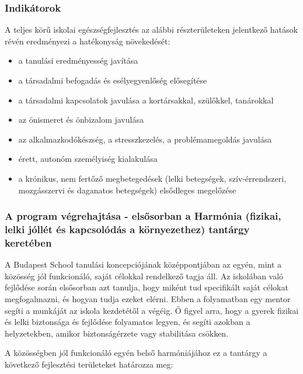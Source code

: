 \subsubsection{Indikátorok}\label{indikuxe1torok}

A teljes körű iskolai egészségfejlesztés az alábbi részterületeken
jelentkező hatások révén eredményezi a hatékonyság növekedését:

\begin{itemize}

\item
  a tanulási eredményesség javítása
\item
  a társadalmi befogadás és esélyegyenlőség elősegítése
\item
  a társadalmi kapcsolatok javulása a kortársakkal, szülőkkel,
  tanárokkal
\item
  az önismeret és önbizalom javulása
\item
  az alkalmazkodókészség, a stresszkezelés, a problémamegoldás javulása
\item
  érett, autonóm személyiség kialakulása
\item
  a krónikus, nem fertőző megbetegedések (lelki betegségek,
  szív-érrendszeri, mozgásszervi és daganatos betegségek) elsődleges
  megelőzése
\end{itemize}

\subsubsection{A program végrehajtása - elsősorban a Harmónia (fizikai,
lelki jóllét és kapcsolódás a környezethez) tantárgy
keretében}\label{a-program-vuxe9grehajtuxe1sa---elsux151sorban-a-harmuxf3nia-fizikai-lelki-juxf3lluxe9t-uxe9s-kapcsoluxf3duxe1s-a-kuxf6rnyezethez-tantuxe1rgy-keretuxe9ben}

A Budapest School tanulási koncepciójának középpontjában az egyén, mint
a közösség jól funkcionáló, saját célokkal rendelkező tagja áll. Az
iskolában való fejlődése során elsősorban azt tanulja, hogy miként tud
specifikált saját célokat megfogalmazni, és hogyan tudja ezeket elérni.
Ebben a folyamatban egy mentor segíti a munkáját az iskola kezdetétől a
végéig. Ő figyel arra, hogy a gyerek fizikai és lelki biztonsága és
fejlődése folyamatos legyen, és segíti azokban a helyzetekben, amikor
biztonságérzete vagy stabilitása csökken.

A közösségben jól funkcionáló egyén belső harmóniájához ez a tantárgy a
következő fejlesztési területeket határozza meg:

